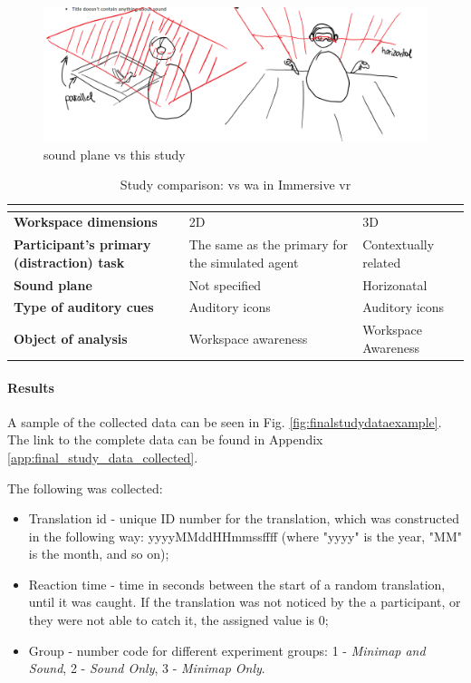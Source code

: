 \begin{figure}[h]
	\centering
	\includegraphics[width=0.7\linewidth]{figures/gutwin_vs_my_study_sound_plane}
	\caption{\cite{gutwin_chalk_2011} sound plane vs this study}
	\label{fig:gutwinvsmystudysoundplane}
\end{figure}

\begin{table}[h]
  \caption{Study comparison: \cite{gutwin_chalk_2011} vs \gls{wa} in Immersive \gls{vr}}
  \label{table:study_comp}
  \begin{tabular}{|l|l|l|}
  \hline
                             & \textbf{\cite{gutwin_chalk_2011}}                & \textbf{\nameref{This study}}           \\ \hline
  \textbf{Workspace dimensions}				 & 2D									   & 3D \\ \hline
  \textbf{Participant's primary (distraction) task} & The same as the primary for the simulated agent & Contextually related \\ \hline
  \textbf{Sound plane}      & Not specified             & Horizonatal          \\ \hline
  \textbf{Type of auditory cues}                 & Auditory icons        & Auditory icons       \\ \hline
  \textbf{Object of analysis}         & Workspace awareness   & Workspace Awareness  \\ \hline
  \end{tabular}
\end{table}

\paragraph{Results}
A sample of the collected data can be seen in Fig. \ref{fig:finalstudydataexample}. The link to the complete data can be found in Appendix \ref{app:final_study_data_collected}.

The following was collected:
\begin{itemize}
	\item Translation id - unique ID number for the translation, which was constructed in the following way: yyyyMMddHHmmssffff (where "yyyy" is the year, "MM" is the month, and so on);
	\item Reaction time - time in seconds between the start of a random translation, until it was caught. If the translation was not noticed by the a participant, or they were not able to catch it, the assigned value is 0;
	\item Group - number code for different experiment groups: 1 - \textit{Minimap and Sound}, 2 - \textit{Sound Only}, 3 - \textit{Minimap Only}.
\end{itemize}

